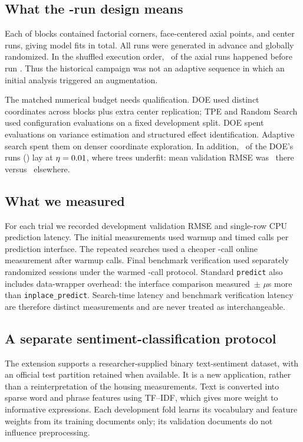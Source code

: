 \documentclass[12pt,a4paper]{article}
\begin{document}
\subsection{What the \numPubDesignRuns{}-run design means}
Each of \numPubBlocks{} blocks contained \numPubCorners{} factorial corners, \numPubAxial{} face-centered axial points, and \numPubCenters{} center runs, giving \numPubDesignRuns{} model fits in total. All runs were generated in advance and globally randomized. In the shuffled execution order, \numDoeAxialBeforeHundred\ of the \numPubAxialTotal{} axial runs happened before run \numPubScreeningRuns{}. Thus the historical campaign was not an adaptive sequence in which an initial analysis triggered an augmentation.

The matched numerical budget needs qualification. DOE used \numPubCoordinates{} distinct coordinates across \numPubBlocks{} blocks plus extra center replication; TPE and Random Search used \numPubOptimizerTrials{} configuration evaluations on a fixed development split. DOE spent evaluations on variance estimation and structured effect identification. Adaptive search spent them on denser coordinate exploration. In addition, \numDoeLowEtaCount\ of the DOE's \numPubDesignRuns{} runs (\numDoeLowEtaPct) lay at $\eta=0.01$, where \numPubTrees{} trees underfit: mean validation RMSE was \numDoeLowEtaMeanRMSE\ there versus \numDoeHighEtaMeanRMSE\ elsewhere.

\subsection{What we measured}
For each trial we recorded development validation RMSE and single-row CPU prediction latency. The initial measurements used warmup and \numPubPrimaryCalls{} timed calls per prediction interface. The repeated searches used a cheaper \numPubOnlineCalls{}-call online measurement after \numPubOnlineWarmups{} warmup calls. Final benchmark verification used \numPubPrimarySessions{} separately randomized sessions under the warmed \numPubPrimaryCalls{}-call protocol. Standard \texttt{predict} also includes data-wrapper overhead: the interface comparison measured \numRevInterfaceOverhead\,$\pm$\,\numRevInterfaceOverheadSd\,$\mu$s more than \texttt{inplace\_predict}. Search-time latency and benchmark verification latency are therefore distinct measurements and are never treated as interchangeable.

\subsection{A separate sentiment-classification protocol}
The extension supports a researcher-supplied binary text-sentiment dataset, with an official test partition retained when available. It is a new application, rather than a reinterpretation of the housing measurements. Text is converted into sparse word and phrase features using TF--IDF, which gives more weight to informative expressions. Each development fold learns its vocabulary and feature weights from its training documents only; its validation documents do not influence preprocessing.
\end{document}
